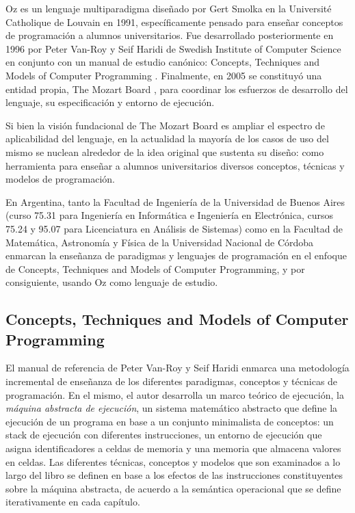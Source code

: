 \documentclass[a4paper,11pt]{article}
\begin{document}
Oz \cite{oz} es un lenguaje multiparadigma diseñado por Gert Smolka en la
Université Catholique de Louvain en 1991, específicamente pensado para enseñar
conceptos de programación a alumnos universitarios. Fue desarrollado
posteriormente en 1996 por Peter Van-Roy y Seif Haridi de Swedish Institute of
Computer Science en conjunto con un manual de estudio canónico: Concepts,
Techniques and Models of Computer Programming \cite{ctmcp}. Finalmente, en 2005
se constituyó una entidad propia, The Mozart Board \cite{mozboard}, para
coordinar los esfuerzos de desarrollo del lenguaje, su especificación y entorno
de ejecución.

Si bien la visión fundacional de The Mozart Board es ampliar el espectro de
aplicabilidad del lenguaje, en la actualidad la mayoría de los casos de uso del
mismo se nuclean alrededor de la idea original que sustenta su diseño: como
herramienta para enseñar a alumnos universitarios diversos conceptos, técnicas
y modelos de programación.

En Argentina, tanto la Facultad de Ingeniería de la Universidad de Buenos Aires
(curso 75.31 para Ingeniería en Informática e Ingeniería en Electrónica, cursos
75.24 y 95.07 para Licenciatura en Análisis de Sistemas) como en la Facultad de
Matemática, Astronomía y Física de la Universidad Nacional de Córdoba enmarcan
la enseñanza de paradigmas y lenguajes de programación en el enfoque de
Concepts, Techniques and Models of Computer Programming, y por consiguiente,
usando Oz como lenguaje de estudio.

\subsection{Concepts, Techniques and Models of Computer Programming}

El manual de referencia de Peter Van-Roy y Seif Haridi \cite{ctmcp} enmarca una
metodología incremental de enseñanza de los diferentes paradigmas, conceptos y
técnicas de programación.  En el mismo, el autor desarrolla un marco teórico de
ejecución, la \emph{máquina abstracta de ejecución}, un sistema matemático
abstracto que define la ejecución de un programa en base a un conjunto
minimalista de conceptos: un stack de ejecución con diferentes instrucciones,
un entorno de ejecución que asigna identificadores a celdas de memoria y una
memoria que almacena valores en celdas. Las diferentes técnicas, conceptos y
modelos que son examinados a lo largo del libro se definen en base a los
efectos de las instrucciones constituyentes sobre la máquina abstracta, de
acuerdo a la semántica operacional que se define iterativamente en cada
capítulo.
\end{document}
